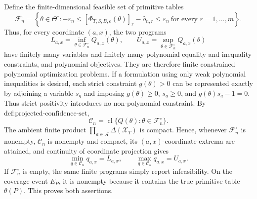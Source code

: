Define the finite-dimensional feasible set of primitive tables
\[
\mathcal F_n^\circ=
\left\{\theta\in\Theta^\circ:
-\varepsilon_n\leq
[\Phi_{T,S,B,e}(\theta)]_r-\widehat o_{n,r}
\leq\varepsilon_n\ \text{for every }r=1,\ldots,m
\right\}.
\]
Thus, for every coordinate \((a,x)\), the two programs
\[
L_{a,x}=\inf_{\theta\in\mathcal F_n^\circ}Q_{a,x}(\theta),
\qquad
U_{a,x}=\sup_{\theta\in\mathcal F_n^\circ}Q_{a,x}(\theta)
\]
have finitely many variables and finitely many polynomial equality and inequality constraints, and polynomial objectives.  They are therefore finite constrained polynomial optimization problems.
If a formulation using only weak polynomial inequalities is desired, each strict constraint \(g(\theta)>0\) can be represented exactly by adjoining a variable \(s_g\) and imposing \(g(\theta)\geq0\), \(s_g\geq0\), and \(g(\theta)s_g-1=0\).  Thus strict positivity introduces no non-polynomial constraint.
By \(\text{def:projected-confidence-set}\),
\[
\mathcal C_n=\operatorname{cl}\{Q(\theta):\theta\in\mathcal F_n^\circ\}.
\]
The ambient finite product \(\prod_{a\in\mathcal A}\Delta(\mathcal X_T)\) is compact.  Hence, whenever \(\mathcal F_n^\circ\) is nonempty, \(\mathcal C_n\) is nonempty and compact, its \((a,x)\)-coordinate extrema are attained, and continuity of coordinate projection gives
\[
\min_{q\in\mathcal C_n}q_{a,x}=L_{a,x},
\qquad
\max_{q\in\mathcal C_n}q_{a,x}=U_{a,x}.
\]
If \(\mathcal F_n^\circ\) is empty, the same finite programs simply report infeasibility.  On the coverage event \(E_P\), it is nonempty because it contains the true primitive table \(\theta(P)\).  This proves both assertions.
